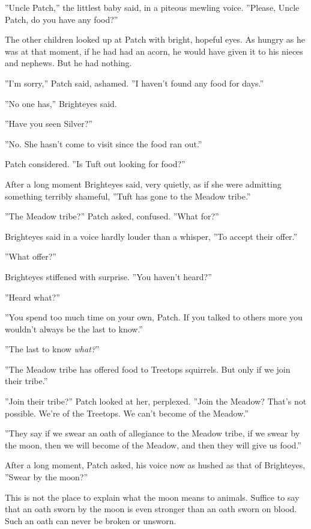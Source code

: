 \documentclass[12pt]{book}
\begin{document}
''Uncle Patch,'' the littlest baby said, in a piteous mewling
voice. ''Please, Uncle Patch, do you have any food?''

The other children looked up at Patch with bright, hopeful eyes. As
hungry as he was at that moment, if he had had an acorn, he would have
given it to his nieces and nephews. But he had nothing.

''I'm sorry,'' Patch said, ashamed. ''I haven't found any food for
days.''

''No one has,'' Brighteyes said.

''Have you seen Silver?''

''No. She hasn't come to visit since the food ran out.''

Patch considered. ''Is Tuft out looking for food?''

After a long moment Brighteyes said, very quietly, as if she were
admitting something terribly shameful, ''Tuft has gone to the Meadow
tribe.''

''The Meadow tribe?'' Patch asked, confused. ''What for?''

Brighteyes said in a voice hardly louder than a whisper, ''To accept
their offer.''

''What offer?''

Brighteyes stiffened with surprise. ''You haven't heard?''

''Heard what?''

''You spend too much time on your own, Patch. If you talked to others
more you wouldn't always be the last to know.''

''The last to know \textit{what?}''

''The Meadow tribe has offered food to Treetops squirrels. But only if
we join their tribe.''

''Join their tribe?'' Patch looked at her, perplexed. ''Join the
Meadow? That's not possible. We're of the Treetops. We can't become of
the Meadow.''

''They say if we swear an oath of allegiance to the Meadow tribe, if
we swear by the moon, then we will become of the Meadow, and then they
will give us food.''

After a long moment, Patch asked, his voice now as hushed as that of
Brighteyes, ''Swear by the moon?''

This is not the place to explain what the moon means to
animals. Suffice to say that an oath sworn by the moon is even
stronger than an oath sworn on blood. Such an oath can never be broken
or unsworn.
\end{document}
